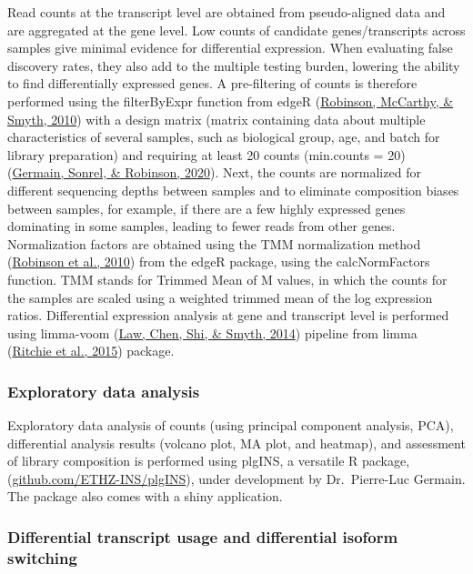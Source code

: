 \documentclass[12pt,twoside]{reedthesis}
\begin{document}
Read counts at the transcript level are obtained from pseudo-aligned
data and are aggregated at the gene level. Low counts of candidate
genes/transcripts across samples give minimal evidence for differential
expression. When evaluating false discovery rates, they also add to the
multiple testing burden, lowering the ability to find differentially
expressed genes. A pre-filtering of counts is therefore performed using
the filterByExpr function from edgeR (\protect\hyperlink{ref-robinson2010}{Robinson, McCarthy, \& Smyth, 2010}) with a design
matrix (matrix containing data about multiple characteristics of several
samples, such as biological group, age, and batch for library
preparation) and requiring at least 20 counts (min.counts = 20)
(\protect\hyperlink{ref-germain2020}{Germain, Sonrel, \& Robinson, 2020}). Next, the counts are normalized for different sequencing
depths between samples and to eliminate composition biases between
samples, for example, if there are a few highly expressed genes
dominating in some samples, leading to fewer reads from other genes.
Normalization factors are obtained using the TMM normalization method
(\protect\hyperlink{ref-robinson2010}{Robinson et al., 2010}) from the edgeR package, using the calcNormFactors
function. TMM stands for Trimmed Mean of M values, in which the counts
for the samples are scaled using a weighted trimmed mean of the log
expression ratios. Differential expression analysis at gene and
transcript level is performed using limma-voom (\protect\hyperlink{ref-law2014}{Law, Chen, Shi, \& Smyth, 2014}) pipeline from
limma (\protect\hyperlink{ref-ritchie2015}{Ritchie et al., 2015}) package.

\hypertarget{m3.2.4}{%
\subsubsection*{Exploratory data analysis}\label{m3.2.4}}

Exploratory data analysis of counts (using principal component analysis,
PCA), differential analysis results (volcano plot, MA plot, and
heatmap), and assessment of library composition is performed using
plgINS, a versatile R package, (\href{https://github.com/ETHZ-INS/plgINS}{github.com/ETHZ-INS/plgINS}),
under development by Dr.~Pierre-Luc Germain. The package also comes with
a shiny application.

\hypertarget{m3.2.5}{%
\subsubsection*{Differential transcript usage and differential isoform switching}\label{m3.2.5}}
\end{document}
